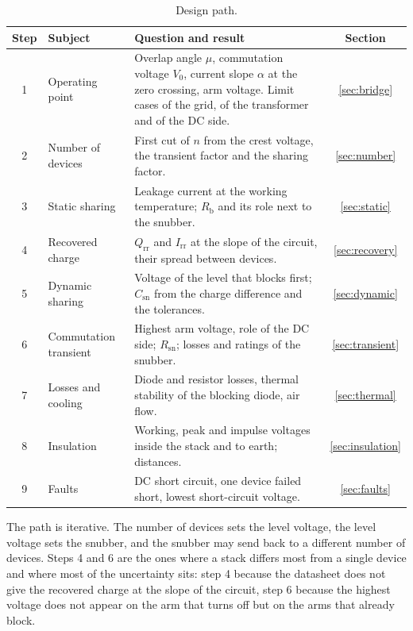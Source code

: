 \documentclass[10pt,a4paper]{scrartcl}
\newcommand{\Qrr}{Q_\mathrm{rr}}
\newcommand{\Irr}{I_\mathrm{rr}}
\newcommand{\Csn}{C_\mathrm{sn}}
\newcommand{\Rsn}{R_\mathrm{sn}}
\newcommand{\Rb}{R_\mathrm{b}}
\newcommand{\Vo}{V_0}
\begin{document}
\begin{table}[htb]
\centering\small
\caption{Design path.}
\label{tab:path}
\begin{tabular}{@{}clp{8.3cm}c@{}}
\toprule
Step & Subject & Question and result & Section \\
\midrule
1 & Operating point & Overlap angle $\mu$, commutation voltage $\Vo$, current slope $\alpha$ at the zero crossing, arm voltage. Limit cases of the grid, of the transformer and of the DC side. & \ref{sec:bridge} \\
2 & Number of devices & First cut of $n$ from the crest voltage, the transient factor and the sharing factor. & \ref{sec:number} \\
3 & Static sharing & Leakage current at the working temperature; $\Rb$ and its role next to the snubber. & \ref{sec:static} \\
4 & Recovered charge & $\Qrr$ and $\Irr$ at the slope of the circuit, their spread between devices. & \ref{sec:recovery} \\
5 & Dynamic sharing & Voltage of the level that blocks first; $\Csn$ from the charge difference and the tolerances. & \ref{sec:dynamic} \\
6 & Commutation transient & Highest arm voltage, role of the DC side; $\Rsn$; losses and ratings of the snubber. & \ref{sec:transient} \\
7 & Losses and cooling & Diode and resistor losses, thermal stability of the blocking diode, air flow. & \ref{sec:thermal} \\
8 & Insulation & Working, peak and impulse voltages inside the stack and to earth; distances. & \ref{sec:insulation} \\
9 & Faults & DC short circuit, one device failed short, lowest short-circuit voltage. & \ref{sec:faults} \\
\bottomrule
\end{tabular}
\end{table}

The path is iterative. The number of devices sets the level voltage, the level voltage sets the snubber, and the snubber may send back to a different number of devices. Steps 4 and 6 are the ones where a stack differs most from a single device and where most of the uncertainty sits: step 4 because the datasheet does not give the recovered charge at the slope of the circuit, step 6 because the highest voltage does not appear on the arm that turns off but on the arms that already block.

\end{document}
